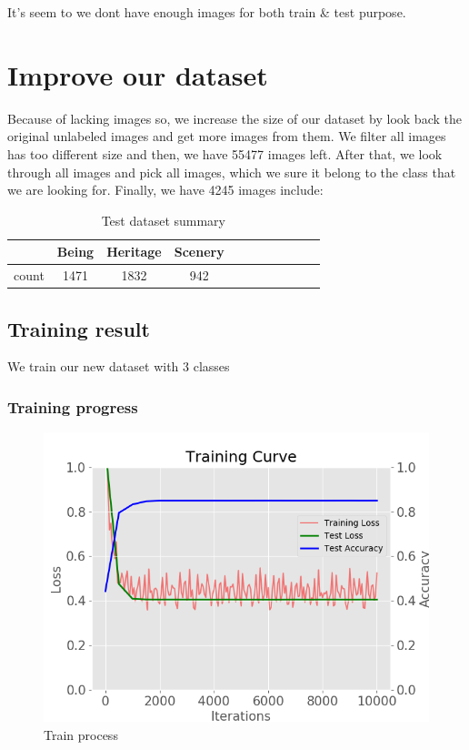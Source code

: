 \documentclass[11pt]{article}
\begin{document}
It's seem to we dont have enough images for both train \& test purpose. 

\section{Improve our dataset}

Because of lacking images so, we increase the size of our dataset by look back the original unlabeled images and get more images from them. We filter all images has too different size and then, we have 55477 images left. After that, we  look through all images and pick all images, which we sure it belong to the class that we are looking for. Finally, we have 4245 images include:
 
\begin{table}[H]
\begin{center}
\begin{tabular}{| c | c | c | c | c | c | c | c | c | c | c |}
\hline
 & Being & Heritage & Scenery\\
\hline
count & 1471 & 1832 & 942 \\
\hline
\end{tabular}
\caption {Test dataset summary}
\end{center}
\end{table}

\subsection{Training result}

We train our new dataset with 3 classes

\subsubsection{Training progress}

\begin{figure}[H]
\centering
\includegraphics[width=1\textwidth]{images/train_large_dataset}
\caption{Train process}
\end{figure}
\end{document}

